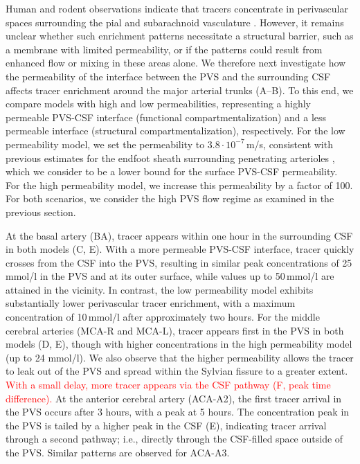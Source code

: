 \documentclass[fleqn,10pt]{wlscirep}
\newcommand{\discuss}[1]{\textcolor{red}{#1}}
\begin{document}
Human and rodent observations indicate that tracers concentrate in perivascular spaces surrounding the pial and subarachnoid vasculature \cite{zhang1990interrelationships,zhang1992directional, bedussi2017paravascular, mestre2018flow, bedussi2018paravascular, eide2024functional}. However, it remains unclear whether such enrichment patterns necessitate a structural barrier, such as a membrane with limited permeability, or if the patterns could result from enhanced flow or mixing in these areas alone. We therefore next investigate how the permeability of the interface between the PVS and the surrounding CSF affects tracer enrichment around the major arterial trunks (A--B). To this end, we compare models with high and low  permeabilities, representing a highly permeable PVS-CSF interface (functional compartmentalization) and a less permeable interface (structural compartmentalization), respectively. For the low permeability model, we set the permeability to $3.8 \cdot 10^{-7}\,$m/s, consistent with previous estimates for the endfoot sheath surrounding penetrating arterioles \cite{koch2023estimates}, which we consider to be a lower bound for the surface PVS-CSF permeability. For the high permeability model, we increase this permeability by a factor of 100. For both scenarios, we consider the high PVS flow regime as examined in the previous section.

At the basal artery (BA), tracer appears within one hour in the surrounding CSF in both models (C, E). With a more permeable PVS-CSF interface, tracer quickly crosses from the CSF into the PVS, resulting in similar peak concentrations of 25\,mmol/l in the PVS and at its outer surface, while values up to 50\,mmol/l are attained in the vicinity. In contrast, the low permeability model exhibits substantially lower perivascular tracer enrichment, with a maximum concentration of 10\,mmol/l after approximately two hours.
For the middle cerebral arteries (MCA-R and MCA-L), tracer appears
first in the PVS in both models (D, E),
though with higher concentrations in the high permeability model (up
to 24 mmol/l). We also observe that the higher permeability allows the
tracer to leak out of the PVS and spread within the Sylvian fissure to
a greater extent. \discuss{With a small delay, more tracer appears via
  the CSF pathway (\Cref{fig:compartmentalization}F, peak time
  difference).} At the anterior cerebral artery (ACA-A2), the first tracer arrival in the PVS occurs after 3 hours, with a peak at 5 hours. The concentration peak in the PVS is tailed by a higher peak in the CSF (E), indicating tracer arrival through a second pathway; i.e., directly through the CSF-filled space outside of the PVS. Similar patterns are observed for ACA-A3.
\end{document}
